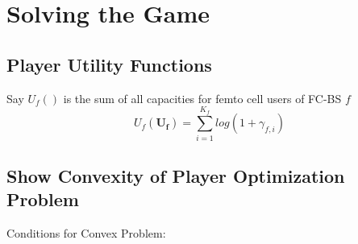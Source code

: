 \documentclass[12pt]{article}
\begin{document}
\section{Solving the Game}
\subsection{Player Utility Functions}

Say $U_f() $ is the sum of all capacities for femto cell users of FC-BS $f$ 
\begin{displaymath}
U_f(\mathbf{U_f}) = \sum^{K_f}_{i=1} log(1+\gamma_{f,i})
\end{displaymath}

\subsection{Show Convexity of Player Optimization Problem}

Conditions for Convex Problem:
\end{document}
